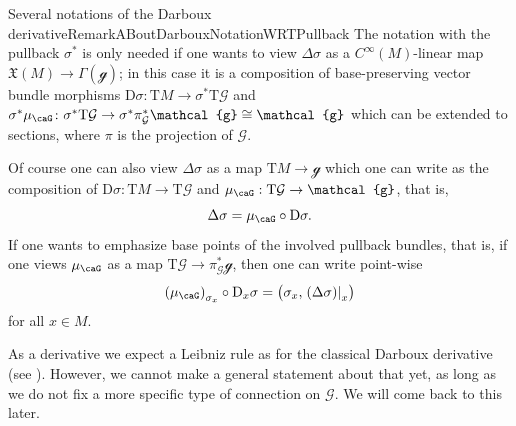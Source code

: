 \documentclass[reqno,a4paper,oneside]{amsart}
\newcommand\mutot{\mu_\caG}
\theoremstyle{plain}
\theoremstyle{remark}
\theoremstyle{definition}
\begin{document}
\begin{remarks}{Several notations of the Darboux derivative}{RemarkABoutDarbouxNotationWRTPullback}
The notation with the pullback $\sigma^*$ is only needed if one wants to view $\Delta \sigma$ as a $C^\infty(M)$-linear map $\mathfrak{X}(M) \to \Gamma(\mathcal{g})$; in this case it is a composition of base-preserving vector bundle morphisms $\mathrm{D}\sigma\colon \mathrm{T}M \to \sigma^*\mathrm{T}\mathcal{G}$ and $\sigma^*\mutot\colon \sigma^*\mathrm{T}\mathcal{G} \to \sigma^*\pi_{\mathcal{G}}^*\mathcal{g} \cong \mathcal{g}$ which can be extended to sections, where $\pi$ is the projection of $\mathcal{G}$.

Of course one can also view $\Delta \sigma$ as a map $\mathrm{T}M \to \mathcal{g}$ which one can write as the composition of $\mathrm{D}\sigma: \mathrm{T}M \to \mathrm{T}\mathcal{G}$ and $\mutot: \mathrm{T}\mathcal{G} \to \mathcal{g}$, that is,
\begin{equation*}
\Delta \sigma
=
\mutot \circ \mathrm{D}\sigma.
\end{equation*}
If one wants to emphasize base points of the involved pullback bundles, that is, if one views $\mutot$ as a map $\mathrm{T}\mathcal{G} \to \pi_{\mathcal{G}}^*\mathcal{g}$, then one can write point-wise
\begin{equation*}
\mleft(\mutot\mright)_{\sigma_x} \circ \mathrm{D}_x\sigma
=
\bigl(
	\sigma_x, \mleft.\mleft(\Delta \sigma\mright)\mright|_x
\bigr)
\end{equation*}
for all $x \in M$.
\end{remarks}

As a derivative we expect a Leibniz rule as for the classical Darboux derivative (see \cite[\S 5.1, Eq.\ 2, page 182]{mackenzieGeneralTheory}). However, we cannot make a general statement about that yet, as long as we do not fix a more specific type of connection on $\mathcal{G}$. We will come back to this later.
\end{document}
